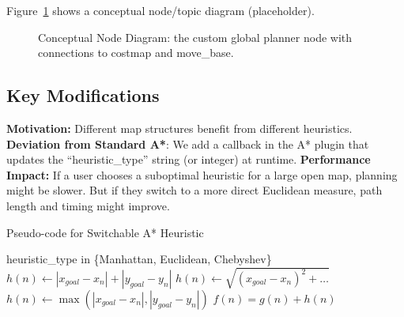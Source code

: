 \documentclass[letterpaper, 10 pt, conference]{ieeeconf}
\begin{document}
Figure~\ref{fig:rqt_graph} shows a conceptual node/topic diagram (placeholder).

\begin{figure}[!ht]
    \centering
    \caption{Conceptual Node Diagram: the custom global planner node 
    with connections to costmap and move\_base.}
    \label{fig:rqt_graph}
\end{figure}

\subsection{Key Modifications}
\textbf{Motivation:} 
Different map structures benefit from different heuristics.  
\textbf{Deviation from Standard A*}: 
We add a callback in the A* plugin that updates the “heuristic\_type” string 
(or integer) at runtime.  
\textbf{Performance Impact:} 
If a user chooses a suboptimal heuristic for a large open map, planning might 
be slower. But if they switch to a more direct Euclidean measure, path length 
and timing might improve.

\begin{algorithm}[H]
\caption{Pseudo-code for Switchable A* Heuristic}
\label{alg:alg2}
\begin{algorithmic}[1]
\REQUIRE heuristic\_type in \{Manhattan, Euclidean, Chebyshev\}
    \STATE $h(n) \leftarrow |x_{goal} - x_n| + |y_{goal} - y_n|$
    \STATE $h(n) \leftarrow \sqrt{(x_{goal}-x_n)^2 + \dots}$
    \STATE $h(n) \leftarrow \max(|x_{goal}-x_n|,|y_{goal}-y_n|)$
\ENDIF
\RETURN $f(n) = g(n) + h(n)$
\end{algorithmic}
\end{algorithm}
\end{document}
